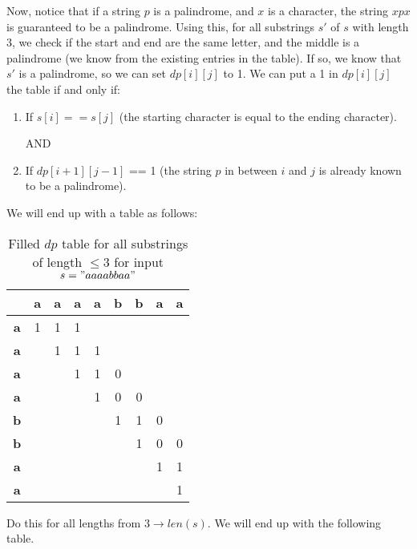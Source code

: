 Now, notice that if a string $p$ is a palindrome, and $x$ is a character, the string $xpx$ is guaranteed to be a palindrome.
Using this, for all substrings $s'$ of $s$ with length 3, we check if the start and end are the same letter, and the middle is a palindrome (we know from the existing entries in the table).
If so, we know that $s'$ is a palindrome, so we can set $dp[i][j]$ to 1.
We can put a 1 in $dp[i][j]$ the table if and only if:

\begin{enumerate}
    \item If $s[i] == s[j]$ (the starting character is equal to the ending character).

    AND

    \item If $dp[i+1][j-1]$ == 1 (the string $p$ in between $i$ and $j$ is already known to be a palindrome).

\end{enumerate}

We will end up with a table as follows:

\begin{table}[htbp]
    \centering
    \begin{tabular}{|c|c|c|c|c|c|c|c|c|}
        \hline
          & \textbf{a} & \textbf{a} & \textbf{a} & \textbf{a} & \textbf{b} & \textbf{b} & \textbf{a} & \textbf{a} \\
        \hline
        \textbf{a} & 1 & 1 & 1 &  &  &  &  &  \\
        \hline
        \textbf{a} &  & 1 & 1 & 1 &  &  &  &  \\
        \hline
        \textbf{a} &  &  & 1 & 1 & 0 &  &  &  \\
        \hline
        \textbf{a} &  &  &  & 1 & 0 & 0 &  &  \\
        \hline
        \textbf{b} &  &  &  &  & 1 & 1 & 0 &  \\
        \hline
        \textbf{b} &  &  &  &  &  & 1 & 0 & 0 \\
        \hline
        \textbf{a} &  &  &  &  &  &  & 1 & 1 \\
        \hline
        \textbf{a} &  &  &  &  &  &  &  & 1 \\
        \hline
    \end{tabular}
    \caption{Filled $dp$ table for all substrings of length $\leq 3$ for input $s="aaaabbaa"$}
\end{table}

Do this for all lengths from $3 \rightarrow len(s)$.
We will end up with the following table.

